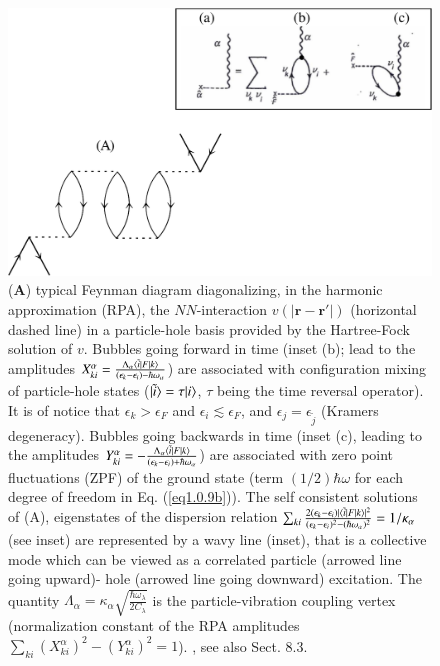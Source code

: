 \begin{figure}
	\centerline {
		\includegraphics*[width=12cm]{introduccion/figs/figpreface7}
	}
	\caption{(\textbf{A}) typical Feynman diagram diagonalizing, in the harmonic approximation (RPA), the $NN$-interaction $v(|\mathbf r-\mathbf r'|)$ (horizontal dashed line) in a particle-hole basis provided by the Hartree-Fock solution of $v$. Bubbles going forward in time (inset (b); lead to the amplitudes $X^\alpha_{ki}=\frac{\Lambda_\alpha\langle {\tilde i|F|k} \rangle}{(\epsilon_k-\epsilon_i)-\hbar\omega_\alpha}$) are associated with configuration mixing of particle-hole states  ($|{\tilde i} \rangle=\tau|{i} \rangle$,  $\tau$ being the time reversal operator). It is of notice that $\epsilon_k>\epsilon_F$ and $\epsilon_i\lesssim\epsilon_F$, and $\epsilon_j=\epsilon_{\widetilde j}$ (Kramers degeneracy). Bubbles going backwards in time (inset (c), leading to the amplitudes $Y^\alpha_{ki}=-\frac{\Lambda_\alpha\langle {\tilde i|F|k} \rangle}{(\epsilon_k-\epsilon_i)+\hbar\omega_\alpha}$) are associated with zero point  fluctuations (ZPF) of the ground state (term $(1/2)\hbar\omega$ for each degree of freedom in Eq. (\ref{eq1.0.9b})). The self consistent solutions of (A), eigenstates of the dispersion relation $\sum_{ki}\frac{2(\epsilon_k-\epsilon_i)|\langle {\tilde i|F|k} \rangle|^2}{(\epsilon_k-\epsilon_i)^2-(\hbar\omega_\alpha)^2}=1/\kappa_\alpha$ (see inset) are represented by a wavy line (inset), that is a collective mode which can be viewed as a correlated particle (arrowed line going upward)- hole (arrowed line going downward) excitation. The quantity $\Lambda_\alpha=\kappa_\alpha\sqrt{\frac{\hbar\omega_\lambda}{2C_\lambda}}$ is the particle-vibration coupling vertex (normalization constant of the RPA amplitudes $\sum_{ki}\left(X^\alpha_{ki}\right)^2-\left(Y^\alpha_{ki}\right)^2=1$). \cite{Bohm:51,Bohm:53}, see also \cite{Brink:05} Sect. 8.3.}
	\label{fig1.0.7}
\end{figure}

